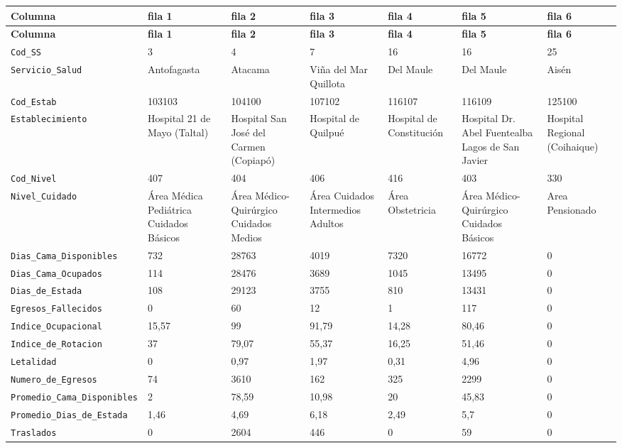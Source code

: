 \documentclass[10pt]{article}
\newcommand{\hdr}[1]{\textbf{\color{white}#1}}
\begin{document}
\footnotesize
\begin{xltabular}{\linewidth}{@{}p{4.3cm} Y Y Y Y Y Y @{}}
\hdr{Columna} & \hdr{fila 1} & \hdr{fila 2} & \hdr{fila 3} & \hdr{fila 4} & \hdr{fila 5} & \hdr{fila 6} \\
\endfirsthead
{}\hdr{Columna} & \hdr{fila 1} & \hdr{fila 2} & \hdr{fila 3} & \hdr{fila 4} & \hdr{fila 5} & \hdr{fila 6} \\
\endhead
{}\texttt{Cod\_\allowbreak{}SS} & 3 & 4 & 7 & 16 & 16 & 25 \\
\texttt{Servicio\_\allowbreak{}Salud} & Antofagasta & Atacama & Viña del Mar Quillota & Del Maule & Del Maule & Aisén \\
\texttt{Cod\_\allowbreak{}Estab} & 103103 & 104100 & 107102 & 116107 & 116109 & 125100 \\
\texttt{Establecimiento} & Hospital 21 de Mayo (Taltal) & Hospital San José del Carmen (Copiapó) & Hospital de Quilpué & Hospital de Constitución & Hospital Dr. Abel Fuentealba Lagos de San Javier & Hospital Regional (Coihaique) \\
\texttt{Cod\_\allowbreak{}Nivel} & 407 & 404 & 406 & 416 & 403 & 330 \\
\texttt{Nivel\_\allowbreak{}Cuidado} & Área Médica Pediátrica Cuidados Básicos & Área Médico-{}Qu\allowbreak{}irúrgico Cuidados Medios & Área Cuidados Intermedios Adultos & Área Obstetricia & Área Médico-{}Qu\allowbreak{}irúrgico Cuidados Básicos & Area Pensionado \\
\texttt{Dias\_\allowbreak{}Cama\_\allowbreak{}Disponibles} & 732 & 28763 & 4019 & 7320 & 16772 & 0 \\
\texttt{Dias\_\allowbreak{}Cama\_\allowbreak{}Ocupados} & 114 & 28476 & 3689 & 1045 & 13495 & 0 \\
\texttt{Dias\_\allowbreak{}de\_\allowbreak{}Estada} & 108 & 29123 & 3755 & 810 & 13431 & 0 \\
\texttt{Egresos\_\allowbreak{}Fallecidos} & 0 & 60 & 12 & 1 & 117 & 0 \\
\texttt{Indice\_\allowbreak{}Ocupacional} & 15,57 & 99 & 91,79 & 14,28 & 80,46 & 0 \\
\texttt{Indice\_\allowbreak{}de\_\allowbreak{}Rotacion} & 37 & 79,07 & 55,37 & 16,25 & 51,46 & 0 \\
\texttt{Letalidad} & 0 & 0,97 & 1,97 & 0,31 & 4,96 & 0 \\
\texttt{Numero\_\allowbreak{}de\_\allowbreak{}Egresos} & 74 & 3610 & 162 & 325 & 2299 & 0 \\
\texttt{Promedio\_\allowbreak{}Cama\_\allowbreak{}Disponibles} & 2 & 78,59 & 10,98 & 20 & 45,83 & 0 \\
\texttt{Promedio\_\allowbreak{}Dias\_\allowbreak{}de\_\allowbreak{}Estada} & 1,46 & 4,69 & 6,18 & 2,49 & 5,7 & 0 \\
\texttt{Traslados} & 0 & 2604 & 446 & 0 & 59 & 0 \\
\end{xltabular}
\normalsize
\end{document}
